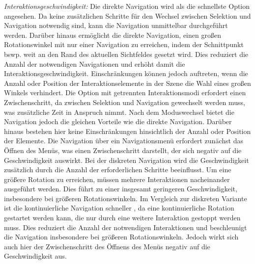 \textit{Interaktionsgeschwindigkeit:}
Die direkte Navigation wird als die schnellste Option angesehen. Da keine zusätzlichen Schritte für den Wechsel zwischen Selektion und Navigation notwendig sind, kann die Navigation unmittelbar durchgeführt werden. Darüber hinaus ermöglicht die direkte Navigation, einen großen Rotationswinkel mit nur einer Navigation zu erreichen, indem der Schnittpunkt bswp. weit an den Rand des aktuellen Sichtfeldes gesetzt wird. Dies reduziert die Anzahl der notwendigen Navigationen und erhöht damit die Interaktionsgeschwindigkeit. Einschränkungen können jedoch auftreten, wenn die Anzahl oder Position der Interaktionselemente in der Szene die Wahl eines großen Winkels verhindert. Die Option mit getrennten Interaktionsmodi erfordert einen Zwischenschritt, da zwischen Selektion und Navigation gewechselt werden muss, was zusätzliche Zeit in Anspruch nimmt. Nach dem Moduswechsel bietet die Navigation jedoch die gleichen Vorteile wie die direkte Navigation. Darüber hinaus bestehen hier keine Einschränkungen hinsichtlich der Anzahl oder Position der Elemente. 
Die Navigation über ein Navigationsmenü erfordert zunächst das Öffnen des Menüs, was einen Zwischenschritt darstellt, der sich negativ auf die Geschwindigkeit auswirkt. Bei der diskreten Navigation wird die Geschwindigkeit zusätzlich durch die Anzahl der erforderlichen Schritte beeinflusst. Um eine größere Rotation zu erreichen, müssen mehrere Interaktionen nacheinander ausgeführt werden. Dies führt zu einer insgesamt geringeren Geschwindigkeit, insbesondere bei größeren Rotationswinkeln. Im Vergleich zur diskreten Variante ist die kontinuierliche Navigation schneller \citep{10.1145/2159365.2159386}, da eine kontinuierliche Rotation gestartet werden kann, die nur durch eine weitere Interaktion gestoppt werden muss. Dies reduziert die Anzahl der notwendigen Interaktionen und beschleunigt die Navigation insbesondere bei größeren Rotationswinkeln. Jedoch wirkt sich auch hier der Zwischenschritt des Öffnens des Menüs negativ auf die Geschwindigkeit aus. 

